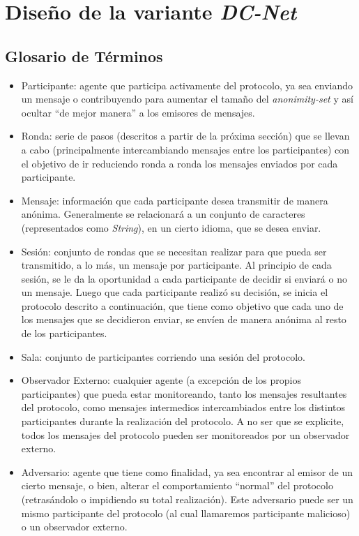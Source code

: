 \chapter{Diseño de la variante \emph{DC-Net}}
\section{Glosario de Términos}

\begin{itemize}
    \item Participante: agente que participa activamente del protocolo, ya sea enviando un mensaje o contribuyendo para aumentar el tamaño del \emph{anonimity-set} y así ocultar ``de mejor manera'' a los emisores de mensajes. 
    \item Ronda: serie de pasos (descritos a partir de la próxima sección) que se llevan a cabo (principalmente intercambiando mensajes entre los participantes) con el objetivo de ir reduciendo ronda a ronda los mensajes enviados por cada participante.  
    \item Mensaje: información que cada participante desea transmitir de manera anónima. Generalmente se relacionará a un conjunto de caracteres (representados como \emph{String}), en un cierto idioma, que se desea enviar.
    \item Sesión: conjunto de rondas que se necesitan realizar para que pueda ser transmitido, a lo más, un mensaje por participante. Al principio de cada sesión, se le da la oportunidad a cada participante de decidir si enviará o no un mensaje. Luego que cada participante realizó su decisión, se inicia el protocolo descrito a continuación, que tiene como objetivo que cada uno de los mensajes que se decidieron enviar, se envíen de manera anónima al resto de los participantes.
    \item Sala: conjunto de participantes corriendo una sesión del protocolo.
    \item Observador Externo: cualquier agente (a excepción de los propios participantes) que pueda estar monitoreando, tanto los mensajes resultantes del protocolo, como mensajes intermedios intercambiados entre los distintos participantes durante la realización del protocolo. A no ser que se explicite, todos los mensajes del protocolo pueden ser monitoreados por un observador externo.
    \item Adversario: agente que tiene como finalidad, ya sea encontrar al emisor de un cierto mensaje, o bien, alterar el comportamiento ``normal'' del protocolo (retrasándolo o impidiendo su total realización). Este adversario puede ser un mismo participante del protocolo (al cual llamaremos participante malicioso) o un observador externo.
\end{itemize}

